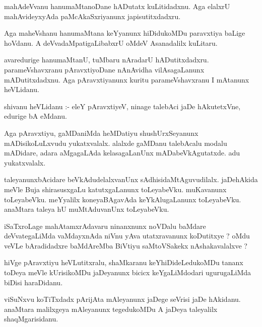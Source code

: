 \documentclass{article}
\begin{document}
\begin{mn}
mahAdeVvanu  hanumaMtanoDane  hADutatx  kuLitidadxnu.  Aga  elalxrU  mahAvideyxyAda  paMcAkaSxriyanunx  japisutitxdadxru.
\end{mn}

\begin{mn}
Aga  maheVshanu  hanumaMtana  keYyanunx  hiDidukoMDu  paravxtiya  baLige  hoVdanu.  A  deVvadaMpatigaLibabxrU  
oMdeV  Asanadalilx  kuLitaru.
\end{mn}

\begin{mn}
avaredurige  hanumaMtanU,  tuMbaru  nAradarU  hADutitxdadxru.  parameVshavxranu  pAravxtiyoDane  nAnAvidha  
vilAsagaLanunx  mADutitxdadxnu.  Aga  pAravxtiyanunx  kuritu  parameVshavxranu  I  mAtanunx  heVLidanu.
\end{mn}

\begin{mn}
shivanu  heVLidanu :- eleY  pAravxtiyeV,  ninage  talebAci  jaDe hAkutetxVne,  edurige  bA  eMdanu.
\end{mn}

\begin{mn}
Aga  pAravxtiyu,  gaMDaniMda  heMDatiyu  shushUrxSeyanunx  mADisikoLuLxvudu  yukatxvalalx.  alalxde  gaMDanu  
talebAcalu  modalu  mADidare,  adara  aMgagaLAda  kelasagaLanUnx  mADabeVkAgutatxde.  adu  yukatxvalalx.
\end{mn}

\begin{mn}
taleyanunxbAcidare  beVkAdudelalxvanUnx  sAdhisidaMtAguvudilalx.  jaDehAkida  meVle  Buja  shirasusxgaLu  
katutxgaLanunx  toLeyabeVku.  muKavanunx  toLeyabeVku.  meYyalilx  koneyaBAgavAda  keYkAlugaLanunx  toLeyabeVku.  
anaMtara  taleya  hU  muMtAduvanUnx  toLeyabeVku.
\end{mn}

\begin{mn}
iSaTxroLage  mahAtamxrAdavaru  ninanxnunx  noVDalu  baMdare  deVvategaLiMda  vaMdayxnAda  niVnu  yAva  
utatxravanunx  koDutitxye ?  oMdu  veVLe  bAradidadxre  baMdAreMba  BiVtiyu  saMtoVSakekx  nAshakavalalxve ?
\end{mn}

\begin{mn}
hiVge  pAravxtiyu  heVLutitxralu,  shaMkaranu  keYhiDideLedukoMDu  tananx  toDeya  meVle  kUrisikoMDu  
jaDeyanunx  bicicx  keYgaLiMdodari  ugurugaLiMda  biDisi  haraDidanu.
\end{mn}

\begin{mn}
viSuNxvu  koTiTxdadx  pArijAta  mAleyanunx  jaDege  seVrisi  jaDe  hAkidanu.  anaMtara  malilxgeya  
mAleyanunx  tegedukoMDu  A  jaDeya  taleyalilx  shaqMgarisidanu.
\end{mn}
\end{document}
